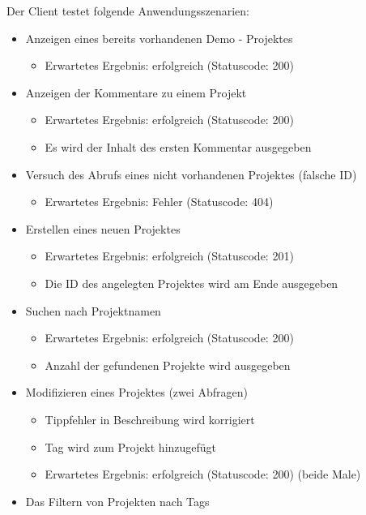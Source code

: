\documentclass[12pt]{scrartcl}
\begin{document}
			Der Client testet folgende Anwendungsszenarien:
			\begin{itemize}
				\item Anzeigen eines bereits vorhandenen Demo - Projektes
				\begin{itemize}
					\item Erwartetes Ergebnis: erfolgreich (Statuscode: 200)
				\end{itemize}
				\item Anzeigen der Kommentare zu einem Projekt
				\begin{itemize}
					\item Erwartetes Ergebnis: erfolgreich (Statuscode: 200)
					\item Es wird der Inhalt des ersten Kommentar ausgegeben
				\end{itemize}
				\item Versuch des Abrufs eines nicht vorhandenen Projektes (falsche ID)
				\begin{itemize}
					\item Erwartetes Ergebnis: Fehler (Statuscode: 404)
				\end{itemize}
				\item Erstellen eines neuen Projektes
				\begin{itemize}
					\item Erwartetes Ergebnis: erfolgreich (Statuscode: 201)
					\item Die ID des angelegten Projektes wird am Ende ausgegeben
				\end{itemize}
				\item Suchen nach Projektnamen
				\begin{itemize}
					\item Erwartetes Ergebnis: erfolgreich (Statuscode: 200)
					\item Anzahl der gefundenen Projekte wird ausgegeben
				\end{itemize}
				\item Modifizieren eines Projektes (zwei Abfragen)
				\begin{itemize}
					\item Tippfehler in Beschreibung wird korrigiert
					\item Tag wird zum Projekt hinzugefügt
					\item Erwartetes Ergebnis: erfolgreich (Statuscode: 200) (beide Male)
				\end{itemize}
				\item Das Filtern von Projekten nach Tags
				\begin{itemize}

\end{itemize}
\end{itemize}
\end{document}
